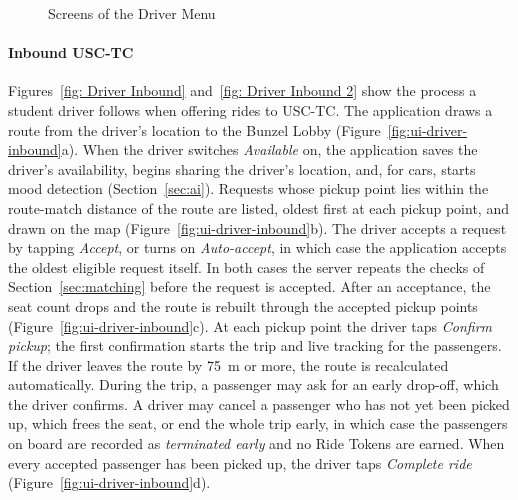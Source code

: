 
    \begin{figure}[htbp]
        \centering
        \hfill
        \hfill
        \caption{Screens of the Driver Menu}
        \label{fig:ui-driver-menu}
    \end{figure}

\paragraph{Inbound USC-TC} Figures~\ref{fig: Driver Inbound} and~\ref{fig: Driver Inbound 2} show the process a student driver follows when offering rides to USC-TC. The application draws a route from the driver's location to the Bunzel Lobby (Figure~\ref{fig:ui-driver-inbound}a). When the driver switches \emph{Available} on, the application saves the driver's availability, begins sharing the driver's location, and, for cars, starts mood detection (Section~\ref{sec:ai}). Requests whose pickup point lies within the route-match distance of the route are listed, oldest first at each pickup point, and drawn on the map (Figure~\ref{fig:ui-driver-inbound}b). The driver accepts a request by tapping \emph{Accept}, or turns on \emph{Auto-accept}, in which case the application accepts the oldest eligible request itself. In both cases the server repeats the checks of Section~\ref{sec:matching} before the request is accepted. After an acceptance, the seat count drops and the route is rebuilt through the accepted pickup points (Figure~\ref{fig:ui-driver-inbound}c). At each pickup point the driver taps \emph{Confirm pickup}; the first confirmation starts the trip and live tracking for the passengers. If the driver leaves the route by 75~m or more, the route is recalculated automatically. During the trip, a passenger may ask for an early drop-off, which the driver confirms. A driver may cancel a passenger who has not yet been picked up, which frees the seat, or end the whole trip early, in which case the passengers on board are recorded as \emph{terminated early} and no Ride Tokens are earned. When every accepted passenger has been picked up, the driver taps \emph{Complete ride} (Figure~\ref{fig:ui-driver-inbound}d).



